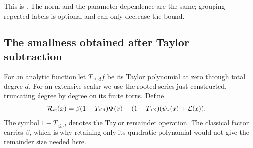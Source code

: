\documentclass[11pt,reqno]{amsart}
\numberwithin{equation}{section}
\theoremstyle{definition}
\theoremstyle{remark}
\begin{document}
This is \cite[Proposition~16.7 and (16.14)--(16.15),
pp.~84--85]{Main}. The norm and the parameter
dependence are the same; grouping repeated labels
is optional and can only decrease the bound.

\subsection{The smallness obtained after Taylor subtraction}

For an analytic function let \(T_{\le d}f\) be its
Taylor polynomial at zero through total degree
\(d\). For an extensive scalar we use the rooted
series just constructed, truncating degree by degree
on its finite torus. Define
\begin{equation}
 \mathcal R_{\rm st}(x)
       =\beta(1-T_{\le4})\Psi(x)
                  +(1-T_{\le2})(\psi_*(x)+\mathcal L(x)).
 \label{eq:local-stationary-remainder}
\end{equation}
The symbol \(1-T_{\le d}\) denotes the Taylor
remainder operation.
The classical factor carries \(\beta\), which is
why retaining only its quadratic polynomial would
not give the remainder size needed here.
\end{document}
